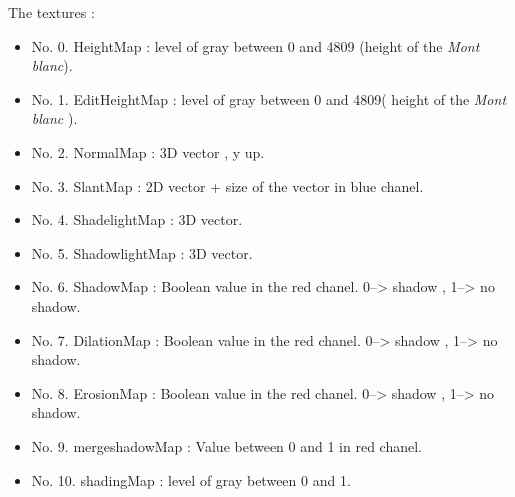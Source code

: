 \documentclass[a4paper]{article}
\begin{document}
The textures :
\begin{itemize}

\item No. 0. HeightMap : level of gray between 0 and 4809 (height of the \textit{Mont blanc}).
\item No. 1. EditHeightMap : level of gray between 0 and 4809( height of the \textit{Mont blanc} ).
\item No. 2. NormalMap : 3D vector , y up.
\item No. 3. SlantMap : 2D vector + size of the vector in blue chanel.
\item No. 4. ShadelightMap : 3D vector.
\item No. 5. ShadowlightMap : 3D vector.
\item No. 6. ShadowMap : Boolean value in the red chanel. 0--> shadow , 1--> no shadow. 
\item No. 7. DilationMap : Boolean value in the red chanel. 0--> shadow , 1--> no shadow. 
\item No. 8. ErosionMap : Boolean value in the red chanel. 0--> shadow , 1--> no shadow. 
\item No. 9. mergeshadowMap :  Value between 0 and 1 in red chanel.
\item No. 10. shadingMap : level of gray between 0 and 1. 
\end{itemize}
\end{document}

